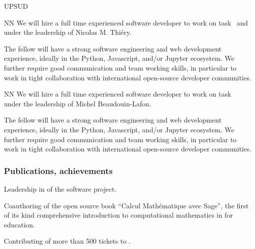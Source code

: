 \begin{sitedescription}{UPSUD}
\begin{participant}[type=res,PM=12]{NN}
  We will hire a full time experienced software developer to work on
  task~ and~ %
  under the leadership of Nicolas M. Thiéry.

  The fellow will have a strong software engineering and web
  development experience, ideally in the Python, Javascript, and/or
  Jupyter ecosystem. We further require good communication and team
  working skills, in particular to work in tight collaboration with
  international open-source developer communities.
\end{participant}

\begin{participant}[type=res,PM=12]{NN}
  We will hire a full time experienced software developer to work
  on task~\taskref{} %
  under the leadership of Michel Beaudouin-Lafon.

  The fellow will have a strong software engineering and web
  development experience, ideally in the Python, Javascript, and/or
  Jupyter ecosystem. We further require good communication and team
  working skills, in particular to work in tight collaboration with
  international open-source developer communities.
\end{participant}


\subsubsection*{Publications, achievements}

\begin{compactenum}
\item Leadership in of the \SageCombinat software project.
\item Coauthoring of the open source book ``Calcul Mathématique avec
  Sage'', the first of its kind comprehensive introduction to
  computational mathematics in \Sage for education.
\item Contributing of more than 500 tickets to \Sage.
\end{compactenum}



\end{sitedescription}
